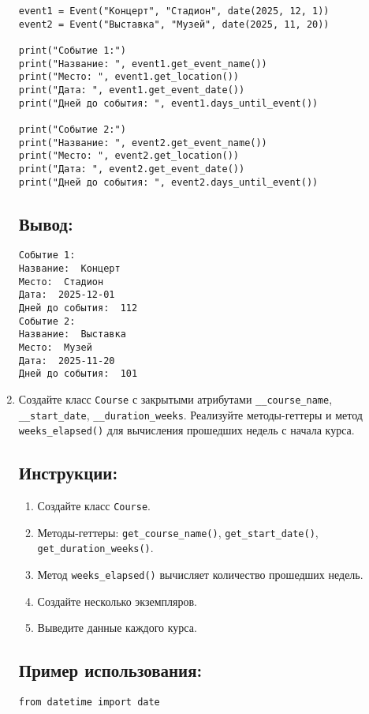 \begin{enumerate}
\begin{lstlisting}[caption=Пример кода]
event1 = Event("Концерт", "Стадион", date(2025, 12, 1))
event2 = Event("Выставка", "Музей", date(2025, 11, 20))

print("Событие 1:")
print("Название: ", event1.get_event_name())
print("Место: ", event1.get_location())
print("Дата: ", event1.get_event_date())
print("Дней до события: ", event1.days_until_event())

print("Событие 2:")
print("Название: ", event2.get_event_name())
print("Место: ", event2.get_location())
print("Дата: ", event2.get_event_date())
print("Дней до события: ", event2.days_until_event())
\end{lstlisting}

\subsection*{Вывод:}
\begin{lstlisting}[caption=Ожидаемый вывод]
Событие 1:
Название:  Концерт
Место:  Стадион
Дата:  2025-12-01
Дней до события:  112
Событие 2:
Название:  Выставка
Место:  Музей
Дата:  2025-11-20
Дней до события:  101
\end{lstlisting}

\item
Создайте класс \texttt{Course} с закрытыми атрибутами \texttt{\_\_course\_name}, \texttt{\_\_start\_date}, \texttt{\_\_duration\_weeks}. Реализуйте методы-геттеры и метод \texttt{weeks\_elapsed()} для вычисления прошедших недель с начала курса.

\subsection*{Инструкции:}
\begin{enumerate}
    \item Создайте класс \texttt{Course}.
    \item Методы-геттеры: \texttt{get\_course\_name()}, \texttt{get\_start\_date()}, \texttt{get\_duration\_weeks()}.
    \item Метод \texttt{weeks\_elapsed()} вычисляет количество прошедших недель.
    \item Создайте несколько экземпляров.
    \item Выведите данные каждого курса.
\end{enumerate}

\subsection*{Пример использования:}
\begin{lstlisting}[caption=Пример кода]
from datetime import date


\end{lstlisting}
\end{enumerate}

